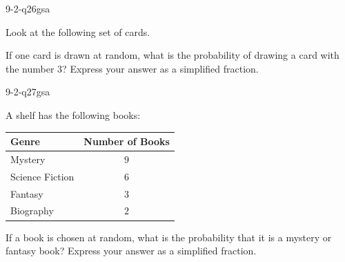 \begin{practiceQuestion}{9-2-q26}{gsa}
\begin{questionText}
Look at the following set of cards.

\begin{center}
\end{center}

If one card is drawn at random, what is the probability of drawing a card with the number $3$? Express your answer as a simplified fraction.
\end{questionText}
\end{practiceQuestion}

\begin{practiceQuestion}{9-2-q27}{gsa}
\begin{questionText}
A shelf has the following books:

\begin{center}
\begin{tabular}{|l|c|}
\hline
\textbf{Genre} & \textbf{Number of Books} \\
\hline
Mystery & $9$ \\
\hline
Science Fiction & $6$ \\
\hline
Fantasy & $3$ \\
\hline
Biography & $2$ \\
\hline
\end{tabular}
\end{center}

If a book is chosen at random, what is the probability that it is a mystery or fantasy book? Express your answer as a simplified fraction.
\end{questionText}
\end{practiceQuestion}
